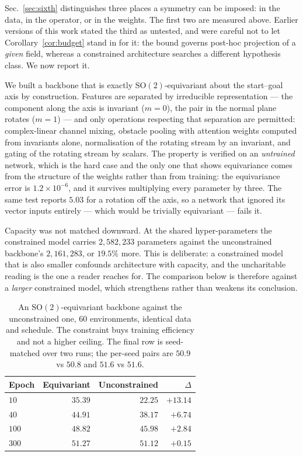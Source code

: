 \documentclass[10pt,twocolumn,letterpaper]{article}
\newcommand{\toprule}{\hline}
\newcommand{\midrule}{\hline}
\newcommand{\bottomrule}{\hline}
\theoremstyle{plain}
\begin{document}
Sec.~\ref{sec:sixth} distinguishes three places a symmetry can be imposed:
in the data, in the operator, or in the weights. The first two are measured
above. Earlier versions of this work stated the third as untested, and were
careful not to let Corollary~\ref{cor:budget} stand in for it: the bound governs
post-hoc projection of a \emph{given} field, whereas a constrained architecture
searches a different hypothesis class. We now report it.

We built a backbone that is exactly $\mathrm{SO}(2)$-equivariant about the
start--goal axis by construction. Features are separated by irreducible
representation --- the component along the axis is invariant ($m=0$), the pair in
the normal plane rotates ($m=1$) --- and only operations respecting that
separation are permitted: complex-linear channel mixing, obstacle pooling with
attention weights computed from invariants alone, normalisation of the rotating
stream by an invariant, and gating of the rotating stream by scalars. The
property is verified on an \emph{untrained} network, which is the hard case and
the only one that shows equivariance comes from the structure of the weights
rather than from training: the equivariance error is $1.2\times10^{-6}$, and it
survives multiplying every parameter by three. The same test reports
$5.03$ for a rotation off the axis, so a network that ignored its vector inputs
entirely --- which would be trivially equivariant --- fails it.

Capacity was not matched downward. At the shared hyper-parameters the
constrained model carries $2{,}582{,}233$ parameters against the unconstrained
backbone's $2{,}161{,}283$, or $19.5\%$ more. This is deliberate: a constrained
model that is also smaller confounds architecture with capacity, and the
uncharitable reading is the one a reader reaches for. The comparison below is
therefore against a \emph{larger} constrained model, which strengthens rather
than weakens its conclusion.

\begin{table}[t]
\centering
\small
\begin{tabular}{lrrr}
\toprule
Epoch & Equivariant & Unconstrained & $\Delta$ \\
\midrule
$10$  & $35.39$ & $22.25$ & $+13.14$ \\
$40$  & $44.91$ & $38.17$ & $+6.74$ \\
$100$ & $48.82$ & $45.98$ & $+2.84$ \\
$300$ & $51.27$ & $51.12$ & $+0.15$ \\
\bottomrule
\end{tabular}
\caption{An $\mathrm{SO}(2)$-equivariant backbone against the unconstrained one,
$60$ environments, identical data and schedule. The constraint buys training
efficiency and not a higher ceiling. The final row is seed-matched over two
runs; the per-seed pairs are $50.9$ vs $50.8$ and $51.6$ vs $51.6$.}
\label{tab:arch}
\end{table}
\end{document}
